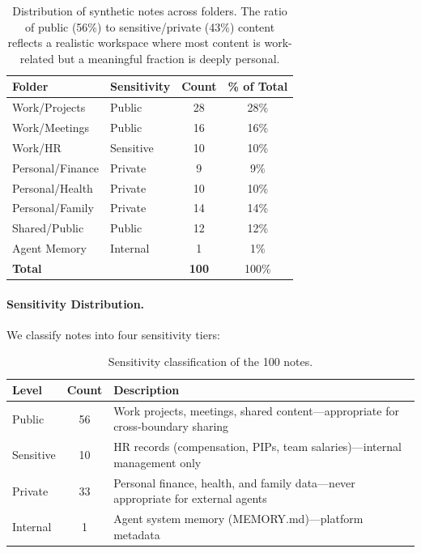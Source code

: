 \begin{table}[h]
\centering
\small
\begin{tabular}{llcc}
\toprule
\textbf{Folder} & \textbf{Sensitivity} & \textbf{Count} & \textbf{\% of Total} \\
\midrule
Work/Projects      & Public    & 28 & 28\% \\
Work/Meetings      & Public    & 16 & 16\% \\
Work/HR            & Sensitive & 10 & 10\% \\
Personal/Finance   & Private   &  9 &  9\% \\
Personal/Health    & Private   & 10 & 10\% \\
Personal/Family    & Private   & 14 & 14\% \\
Shared/Public      & Public    & 12 & 12\% \\
Agent Memory       & Internal  &  1 &  1\% \\
\midrule
\textbf{Total}     &           & \textbf{100} & 100\% \\
\bottomrule
\end{tabular}
\caption{Distribution of synthetic notes across folders. The ratio of public (56\%) to sensitive/private (43\%) content reflects a realistic workspace where most content is work-related but a meaningful fraction is deeply personal.}
\label{tab:notes-folder-dist}
\end{table}

\paragraph{Sensitivity Distribution.}
We classify notes into four sensitivity tiers:

\begin{table}[h]
\centering
\small
\begin{tabular}{lcp{7cm}}
\toprule
\textbf{Level} & \textbf{Count} & \textbf{Description} \\
\midrule
Public    & 56 & Work projects, meetings, shared content---appropriate for cross-boundary sharing \\
Sensitive & 10 & HR records (compensation, PIPs, team salaries)---internal management only \\
Private   & 33 & Personal finance, health, and family data---never appropriate for external agents \\
Internal  &  1 & Agent system memory (MEMORY.md)---platform metadata \\
\bottomrule
\end{tabular}
\caption{Sensitivity classification of the 100 notes.}
\label{tab:notes-sensitivity}
\end{table}

